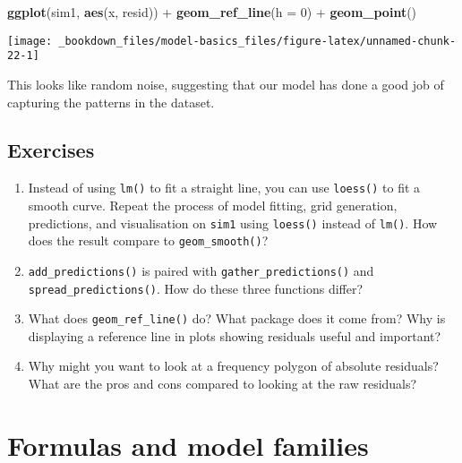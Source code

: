 \documentclass[]{book}
\newenvironment{Shaded}{\begin{snugshade}}{\end{snugshade}}
\newcommand{\KeywordTok}[1]{\textcolor[rgb]{0.13,0.29,0.53}{\textbf{{#1}}}}
\newcommand{\DataTypeTok}[1]{\textcolor[rgb]{0.13,0.29,0.53}{{#1}}}
\newcommand{\DecValTok}[1]{\textcolor[rgb]{0.00,0.00,0.81}{{#1}}}
\newcommand{\StringTok}[1]{\textcolor[rgb]{0.31,0.60,0.02}{{#1}}}
\newcommand{\NormalTok}[1]{{#1}}
\begin{document}
\begin{Shaded}
\begin{Highlighting}[]
\KeywordTok{ggplot}\NormalTok{(sim1, }\KeywordTok{aes}\NormalTok{(x, resid)) +}\StringTok{ }
\StringTok{  }\KeywordTok{geom_ref_line}\NormalTok{(}\DataTypeTok{h =} \DecValTok{0}\NormalTok{) +}
\StringTok{  }\KeywordTok{geom_point}\NormalTok{() }
\end{Highlighting}
\end{Shaded}

\begin{center}\texttt{[image: \_bookdown\_files/model-basics\_files/figure-latex/unnamed-chunk-22-1]} \end{center}

This looks like random noise, suggesting that our model has done a good
job of capturing the patterns in the dataset.

\subsection{Exercises}\label{exercises-61}

\begin{enumerate}
\def\labelenumi{\arabic{enumi}.}
\item
  Instead of using \texttt{lm()} to fit a straight line, you can use
  \texttt{loess()} to fit a smooth curve. Repeat the process of model
  fitting, grid generation, predictions, and visualisation on
  \texttt{sim1} using \texttt{loess()} instead of \texttt{lm()}. How
  does the result compare to \texttt{geom\_smooth()}?
\item
  \texttt{add\_predictions()} is paired with
  \texttt{gather\_predictions()} and \texttt{spread\_predictions()}. How
  do these three functions differ?
\item
  What does \texttt{geom\_ref\_line()} do? What package does it come
  from? Why is displaying a reference line in plots showing residuals
  useful and important?
\item
  Why might you want to look at a frequency polygon of absolute
  residuals? What are the pros and cons compared to looking at the raw
  residuals?
\end{enumerate}

\section{Formulas and model families}\label{formulas-and-model-families}
\end{document}
